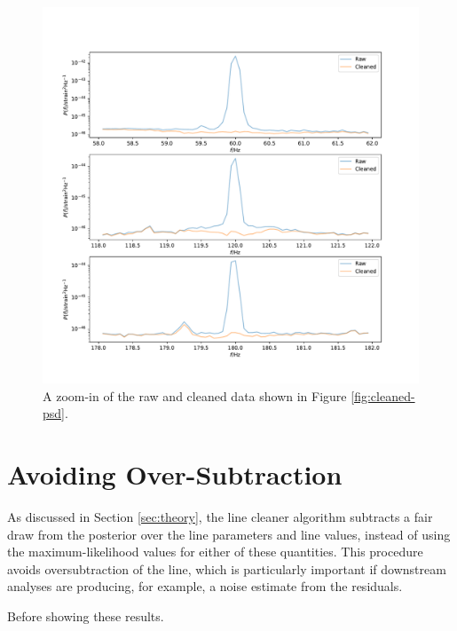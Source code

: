 \documentclass[modern]{aastex631}
\begin{document}
\begin{figure}
    \includegraphics[width=\columnwidth]{line-zoom-in.pdf}
    \caption{\label{fig:line-zoom} A zoom-in of the raw and cleaned data shown in Figure \ref{fig:cleaned-psd}.}
\end{figure}

\appendix

\section{Avoiding Over-Subtraction}
\label{sec:oversubtract}

As discussed in Section \ref{sec:theory}, the line cleaner algorithm subtracts a
fair draw from the posterior over the line parameters and line values, instead
of using the maximum-likelihood values for either of these quantities.  This
procedure avoids oversubtraction of the line, which is particularly important if
downstream analyses are producing, for example, a noise estimate from the
residuals.

Before showing these results.



\end{document}
